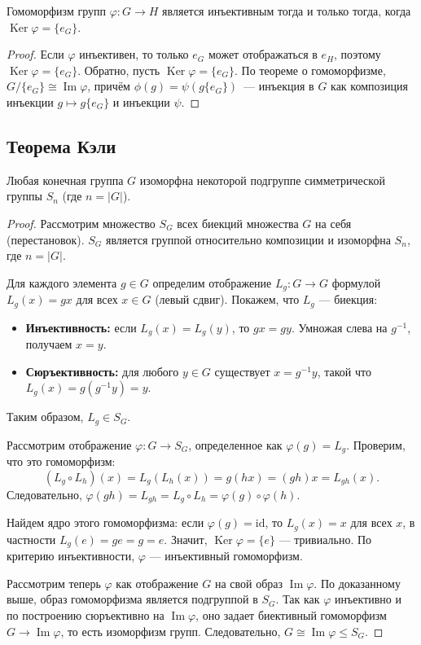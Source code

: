 \documentclass[10pt]{article}
\begin{document}
\begin{corollary}
Гомоморфизм групп $\varphi: G \to H$ является инъективным тогда и только тогда, когда $\operatorname{Ker}\varphi = \{e_G\}$.
\end{corollary}
\begin{proof}
Если $\varphi$ инъективен, то только $e_G$ может отображаться в $e_H$, поэтому $\operatorname{Ker}\varphi = \{e_G\}$.
Обратно, пусть $\operatorname{Ker}\varphi = \{e_G\}$. По теореме о гомоморфизме, $G/\{e_G\} \cong \operatorname{Im}\varphi$, причём $\phi(g) = \psi(g \{e_G\})$~--- инъекция в $G$ как композиция инъекции $g \mapsto g \{e_G\}$ и инъекции $\psi$.
\end{proof}

\subsection{Теорема Кэли}
\begin{theorem}
Любая конечная группа $G$ изоморфна некоторой подгруппе симметрической группы $S_n$ (где $n = |G|$).
\end{theorem}
\begin{proof}
Рассмотрим множество $S_G$ всех биекций множества $G$ на себя (перестановок). $S_G$ является группой относительно композиции и изоморфна $S_n$, где $n = |G|$.

Для каждого элемента $g \in G$ определим отображение $L_g: G \to G$ формулой $L_g(x) = gx$ для всех $x \in G$ (левый сдвиг). Покажем, что $L_g$ — биекция:
\begin{itemize}
    \item \textbf{Инъективность:} если $L_g(x) = L_g(y)$, то $gx = gy$. Умножая слева на $g^{-1}$, получаем $x = y$.
    \item \textbf{Сюръективность:} для любого $y \in G$ существует $x = g^{-1}y$, такой что $L_g(x) = g(g^{-1}y) = y$.
\end{itemize}
Таким образом, $L_g \in S_G$.

Рассмотрим отображение $\varphi: G \to S_G$, определенное как $\varphi(g) = L_g$. Проверим, что это гомоморфизм:
$$(L_g \circ L_h)(x) = L_g(L_h(x)) = g(hx) = (gh)x = L_{gh}(x).$$
Следовательно, $\varphi(gh) = L_{gh} = L_g \circ L_h = \varphi(g) \circ \varphi(h)$.

Найдем ядро этого гомоморфизма: если $\varphi(g) = \text{id}$, то $L_g(x) = x$ для всех $x$, в частности $L_g(e) = ge = g = e$. Значит, $\operatorname{Ker}\varphi = \{e\}$ — тривиально. По критерию инъективности, $\varphi$ — инъективный гомоморфизм.

Рассмотрим теперь $\varphi$ как отображение $G$ на свой образ $\operatorname{Im}\varphi$. По доказанному выше, образ гомоморфизма является подгруппой в $S_G$. Так как $\varphi$ инъективно и по построению сюръективно на $\operatorname{Im}\varphi$, оно задает биективный гомоморфизм $G \to \operatorname{Im}\varphi$, то есть изоморфизм групп. Следовательно, $G \cong \operatorname{Im}\varphi \le S_G$.
\end{proof}
\end{document}
